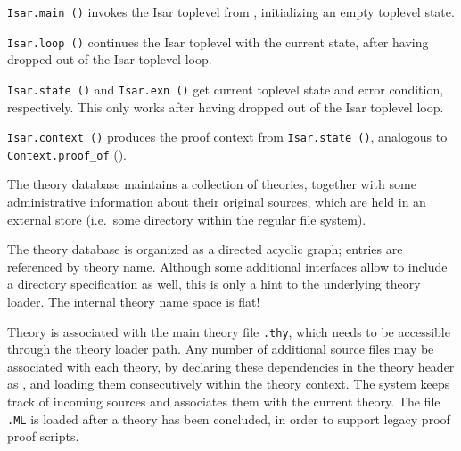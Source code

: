 \begin{isabellebody}
\begin{isamarkuptext}
  \begin{description}

  \item \verb|Isar.main ()| invokes the Isar toplevel from {\ML},
  initializing an empty toplevel state.

  \item \verb|Isar.loop ()| continues the Isar toplevel with the
  current state, after having dropped out of the Isar toplevel loop.

  \item \verb|Isar.state ()| and \verb|Isar.exn ()| get current
  toplevel state and error condition, respectively.  This only works
  after having dropped out of the Isar toplevel loop.

  \item \verb|Isar.context ()| produces the proof context from \verb|Isar.state ()|, analogous to \verb|Context.proof_of|
  ().

  \end{description}%
\end{isamarkuptext}%
\isamarkuptrue%
%
\endisatagmlref
{\isafoldmlref}%
%
\isadelimmlref
%
\endisadelimmlref
%
\isamarkuptrue%
%
\begin{isamarkuptext}%
The theory database maintains a collection of theories, together
  with some administrative information about their original sources,
  which are held in an external store (i.e.\ some directory within the
  regular file system).

  The theory database is organized as a directed acyclic graph;
  entries are referenced by theory name.  Although some additional
  interfaces allow to include a directory specification as well, this
  is only a hint to the underlying theory loader.  The internal theory
  name space is flat!

  Theory  is associated with the main theory file \verb,.thy,, which needs to be accessible through the theory
  loader path.  Any number of additional {\ML} source files may be
  associated with each theory, by declaring these dependencies in the
  theory header as \isa{{\isasymUSES}}, and loading them consecutively
  within the theory context.  The system keeps track of incoming {\ML}
  sources and associates them with the current theory.  The file
  \verb,.ML, is loaded after a theory has been concluded, in
  order to support legacy proof {\ML} proof scripts.


\end{isamarkuptext}
\end{isabellebody}
